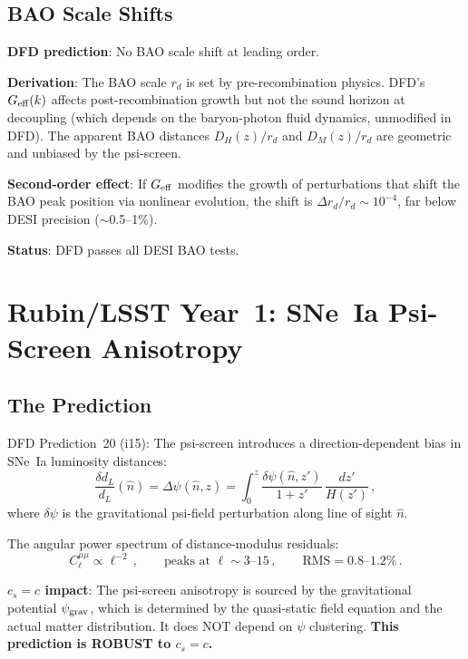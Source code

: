 \documentclass[11pt,a4paper]{article}
\newcommand{\Geff}{G_{\rm eff}}
\begin{document}
\subsection{BAO Scale Shifts}

\textbf{DFD prediction}: No BAO scale shift at leading order.

\textbf{Derivation}: The BAO scale $r_d$ is set by pre-recombination
physics. DFD's $\Geff(k)$ affects post-recombination growth but not
the sound horizon at decoupling (which depends on the baryon-photon
fluid dynamics, unmodified in DFD). The apparent BAO distances
$D_H(z)/r_d$ and $D_M(z)/r_d$ are geometric and unbiased by the
psi-screen.

\textbf{Second-order effect}: If $\Geff$ modifies the growth of
perturbations that shift the BAO peak position via nonlinear
evolution, the shift is $\Delta r_d/r_d \sim 10^{-4}$, far below
DESI precision ($\sim$0.5--1\%).

\textbf{Status}: DFD passes all DESI BAO tests.


\section{Rubin/LSST Year~1: SNe~Ia Psi-Screen Anisotropy}
\label{sec:rubin}

\subsection{The Prediction}

DFD Prediction~20 (i15): The psi-screen introduces a direction-dependent
bias in SNe~Ia luminosity distances:
\begin{equation}
\frac{\delta d_L}{d_L}(\hat{n}) = \Delta\psi(\hat{n}, z)
  = \int_0^z \frac{\delta\psi(\hat{n}, z')}{1+z'}\,
  \frac{dz'}{H(z')}\,,
\end{equation}
where $\delta\psi$ is the gravitational psi-field perturbation along
line of sight $\hat{n}$.

The angular power spectrum of distance-modulus residuals:
\begin{equation}
C_\ell^{\mu\mu} \propto \ell^{-2}\,, \qquad
  \text{peaks at } \ell \sim 3\text{--}15\,,
  \qquad \text{RMS} = 0.8\text{--}1.2\%\,.
\end{equation}

\textbf{$c_s = c$ impact}: The psi-screen anisotropy is sourced by
the gravitational potential $\psi_{\rm grav}$, which is determined
by the quasi-static field equation and the actual matter distribution.
It does NOT depend on $\psi$ clustering. \textbf{This prediction is
ROBUST to $c_s = c$.}
\end{document}
